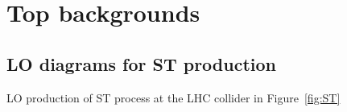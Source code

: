\section{Top backgrounds} %

\label{SectionTop} %




\subsection{LO diagrams for ST production} 

LO production of ST process at the LHC collider in Figure~\ref{fig:ST}
\vspace{5mm}

